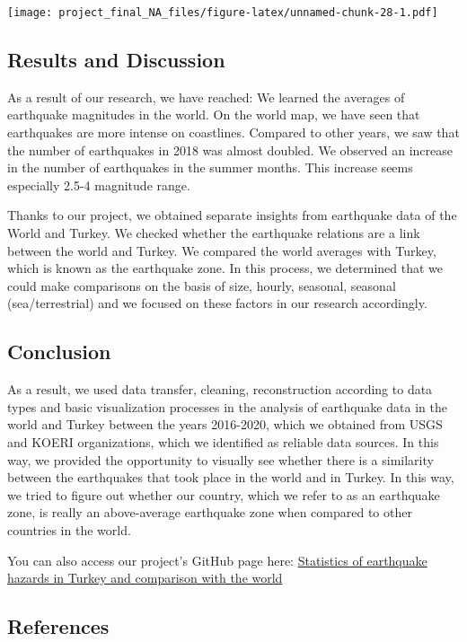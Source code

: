 \documentclass[
]{article}
\begin{document}
\texttt{[image: project\_final\_NA\_files/figure-latex/unnamed-chunk-28-1.pdf]}

\hypertarget{results-and-discussion}{%
\subsection{Results and Discussion}\label{results-and-discussion}}

As a result of our research, we have reached: We learned the averages of
earthquake magnitudes in the world. On the world map, we have seen that
earthquakes are more intense on coastlines. Compared to other years, we
saw that the number of earthquakes in 2018 was almost doubled. We
observed an increase in the number of earthquakes in the summer months.
This increase seems especially 2.5-4 magnitude range.

Thanks to our project, we obtained separate insights from earthquake
data of the World and Turkey. We checked whether the earthquake
relations are a link between the world and Turkey. We compared the world
averages with Turkey, which is known as the earthquake zone. In this
process, we determined that we could make comparisons on the basis of
size, hourly, seasonal, seasonal (sea/terrestrial) and we focused on
these factors in our research accordingly.

\hypertarget{conclusion}{%
\subsection{Conclusion}\label{conclusion}}

As a result, we used data transfer, cleaning, reconstruction according
to data types and basic visualization processes in the analysis of
earthquake data in the world and Turkey between the years 2016-2020,
which we obtained from USGS and KOERI organizations, which we identified
as reliable data sources. In this way, we provided the opportunity to
visually see whether there is a similarity between the earthquakes that
took place in the world and in Turkey. In this way, we tried to figure
out whether our country, which we refer to as an earthquake zone, is
really an above-average earthquake zone when compared to other countries
in the world.

You can also access our project's GitHub page here:
\href{https://github.com/MAT381E-Fall21/project_final_report-na}{Statistics
of earthquake hazards in Turkey and comparison with the world}

\hypertarget{references}{%
\subsection{References}\label{references}}
\end{document}
